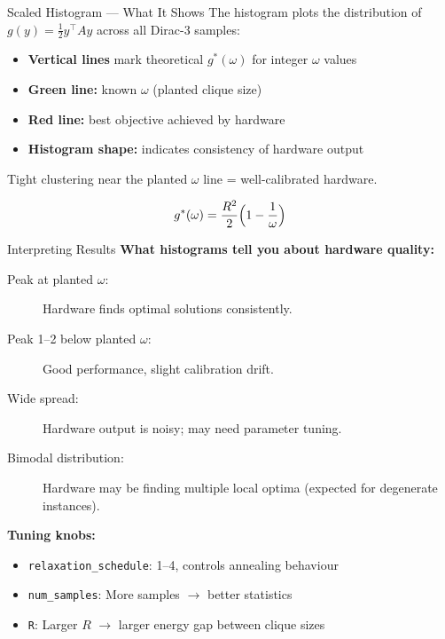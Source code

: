 \documentclass[aspectratio=169]{beamer}
\begin{document}
\begin{frame}{Scaled Histogram --- What It Shows}
    The histogram plots the distribution of $g(y) = \tfrac{1}{2}y^\top A y$ across all Dirac-3 samples:

    \vspace{0.5em}
    \begin{itemize}
        \item \textbf{Vertical lines} mark theoretical $g^*(\omega)$ for integer $\omega$ values
        \item \textbf{Green line:} known $\omega$ (planted clique size)
        \item \textbf{Red line:} best objective achieved by hardware
        \item \textbf{Histogram shape:} indicates consistency of hardware output
    \end{itemize}

    \vspace{0.5em}
    \alert{Tight clustering near the planted $\omega$ line = well-calibrated hardware.}

    \vspace{0.3em}
    \begin{displaymath}
        g^*(\omega) = \frac{R^2}{2}\Bigl(1 - \frac{1}{\omega}\Bigr)
    \end{displaymath}
\end{frame}


\begin{frame}{Interpreting Results}
    \textbf{What histograms tell you about hardware quality:}

    \vspace{0.5em}
    \begin{description}
        \item[Peak at planted $\omega$:] Hardware finds optimal solutions consistently.
        \item[Peak 1--2 below planted $\omega$:] Good performance, slight calibration drift.
        \item[Wide spread:] Hardware output is noisy; may need parameter tuning.
        \item[Bimodal distribution:] Hardware may be finding multiple local optima (expected for degenerate instances).
    \end{description}

    \vspace{0.5em}
    \textbf{Tuning knobs:}
    \begin{itemize}
        \item \texttt{relaxation\_schedule}: 1--4, controls annealing behaviour
        \item \texttt{num\_samples}: More samples $\to$ better statistics
        \item \texttt{R}: Larger $R$ $\to$ larger energy gap between clique sizes
    \end{itemize}
\end{frame}
\end{document}
